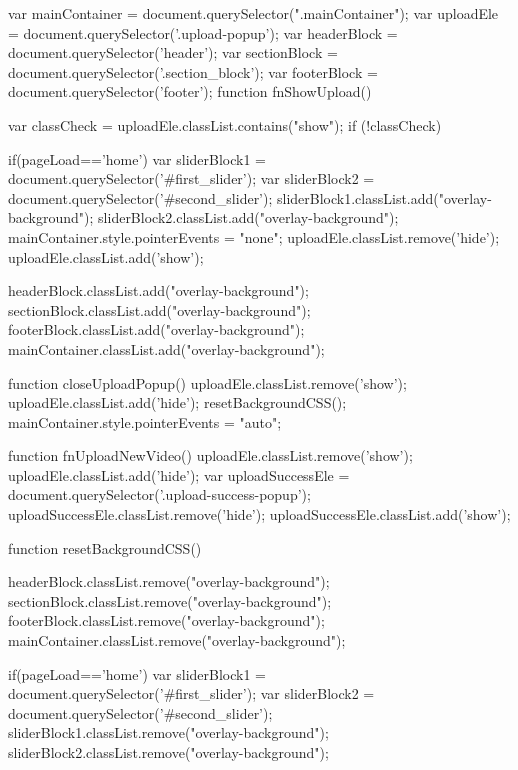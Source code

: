 
        var mainContainer = document.querySelector(".mainContainer");
        var uploadEle = document.querySelector('.upload-popup');
        var headerBlock = document.querySelector('header');
        var sectionBlock = document.querySelector('.section_block'); 
        var footerBlock = document.querySelector('footer');
        function fnShowUpload() {
            var classCheck = uploadEle.classList.contains("show");
            if (!classCheck) {
                if(pageLoad=='home') {
                    var sliderBlock1 = document.querySelector('#first_slider');
                    var sliderBlock2 = document.querySelector('#second_slider');
                    sliderBlock1.classList.add("overlay-background");
                    sliderBlock2.classList.add("overlay-background");
                }
                mainContainer.style.pointerEvents = "none";
                uploadEle.classList.remove('hide');
                uploadEle.classList.add('show');
            
                headerBlock.classList.add("overlay-background");
                sectionBlock.classList.add("overlay-background");
                footerBlock.classList.add("overlay-background");
                mainContainer.classList.add("overlay-background");
        
            }
        }

        function closeUploadPopup() {
            uploadEle.classList.remove('show');
            uploadEle.classList.add('hide');
            resetBackgroundCSS();
            mainContainer.style.pointerEvents = "auto";
        }

        function fnUploadNewVideo() {
            uploadEle.classList.remove('show');
            uploadEle.classList.add('hide');
            var uploadSuccessEle = document.querySelector('.upload-success-popup');
            uploadSuccessEle.classList.remove('hide');
            uploadSuccessEle.classList.add('show');
        }

        function resetBackgroundCSS() {
            headerBlock.classList.remove("overlay-background");
            sectionBlock.classList.remove("overlay-background");
            footerBlock.classList.remove("overlay-background");
            mainContainer.classList.remove("overlay-background");
      
            if(pageLoad=='home') {
                var sliderBlock1 = document.querySelector('#first_slider');
                var sliderBlock2 = document.querySelector('#second_slider');
                sliderBlock1.classList.remove("overlay-background");
                sliderBlock2.classList.remove("overlay-background");
            }
        }

